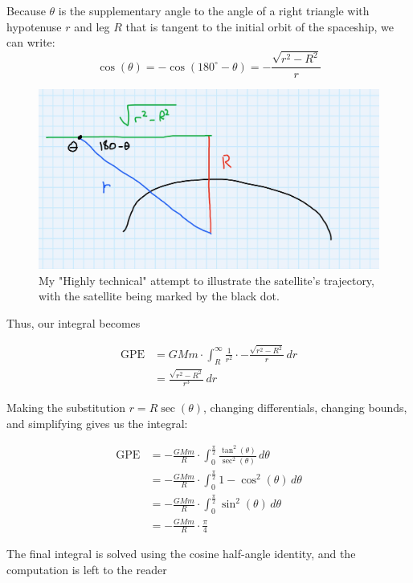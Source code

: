 \documentclass{article}
\begin{document}
  

Because $\theta$ is the supplementary angle to the angle of a right triangle with hypotenuse $r$ and leg $R$ that is tangent to the initial orbit of the spaceship, we can write:
\[\cos(\theta) = -\cos(180^{\circ}-\theta) = -\frac{\sqrt{r^2-R^2}}{r}\]

\begin{figure}
        \centering
        \includegraphics[width=12cm]{Screen Shot 2023-02-22 at 5.42.52 PM}
        \caption{My "Highly technical" attempt to illustrate the satellite's trajectory, with the satellite being marked by the black dot.}
        \label{fig:my_label}
\end{figure}
    
Thus, our integral becomes

    \begin{align*}
        \mathrm{GPE} &= GMm \cdot \int_{R}^{\infty} \frac{1}{r^2} \cdot -\frac{\sqrt{r^2-R^2}}{r} \, dr\\
        &= \frac{\sqrt{r^2-R^2}}{r^3} \, dr
    \end{align*}

    \newpage
    Making the substitution $r = R\sec(\theta)$, changing differentials, changing bounds, and simplifying gives us the integral:

    \begin{align*}
        \mathrm{GPE} &= -\frac{GMm}{R} \cdot \int_{0}^{\frac{\pi}{2}} \frac{\tan^2(\theta)}{\sec^2(\theta)} \, d\theta\\
        &= -\frac{GMm}{R} \cdot \int_{0}^{\frac{\pi}{2}} 1-\cos^2(\theta) \, d\theta\\
        &= -\frac{GMm}{R} \cdot \int_{0}^{\frac{\pi}{2}} \sin^2(\theta) \, d\theta\\
        &= -\frac{GMm}{R} \cdot \frac{\pi}{4}
    \end{align*}
    
    The final integral is solved using the cosine half-angle identity, and the computation is left to the reader
\end{document}

